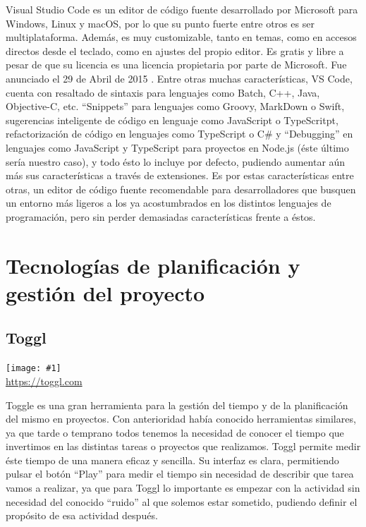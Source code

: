 \documentclass[11pt,openany]{book}
\newcommand{\logo}[2]{\medskip\begin{center}\texttt{[image: \#1]}\\\scriptsize\url{#2}\end{center}\bigskip}
\begin{document}
Visual Studio Code es un editor de código fuente desarrollado por Microsoft para Windows, Linux y macOS, por lo que su punto fuerte entre otros es ser multiplataforma. Además, es muy customizable, tanto en temas, como en accesos directos desde el teclado, como en ajustes del propio editor. Es gratis y libre a pesar de que su licencia es una licencia propietaria por parte de Microsoft. Fue anunciado el 29 de Abril de 2015 \cite{12}. Entre otras muchas características, VS Code, cuenta con resaltado de sintaxis para lenguajes como Batch, C++, Java, Objective-C, etc. ``Snippets'' para lenguajes como Groovy, MarkDown o Swift, sugerencias inteligente de código en lenguaje como JavaScript o TypeScritpt, refactorización de código en lenguajes como TypeScript o C\# y ``Debugging'' en lenguajes como JavaScript y TypeScript para proyectos en Node.js (éste último sería nuestro caso), y todo ésto lo incluye por defecto, pudiendo aumentar aún más sus características a través de extensiones. Es por estas características entre otras, un editor de código fuente recomendable para desarrolladores que busquen un entorno más ligeros a los ya acostumbrados en los distintos lenguajes de programación, pero sin perder demasiadas características frente a éstos.

\section{Tecnologías de planificación y gestión del proyecto}

\subsection{Toggl}

\logo{logos/toggl.png}{https://toggl.com}

Toggle es una gran herramienta para la gestión del tiempo y de la planificación del mismo en proyectos. Con anterioridad había conocido herramientas similares, ya que tarde o temprano todos tenemos la necesidad de conocer el tiempo que invertimos en las distintas tareas o proyectos que realizamos. Toggl permite medir éste tiempo de una manera eficaz y sencilla. Su interfaz es clara, permitiendo pulsar el botón ``Play'' para medir el tiempo sin necesidad de describir que tarea vamos a realizar, ya que para Toggl lo importante es empezar con la actividad sin necesidad del conocido ``ruido'' al que solemos estar sometido, pudiendo definir el propósito de esa actividad después. 
\end{document}
